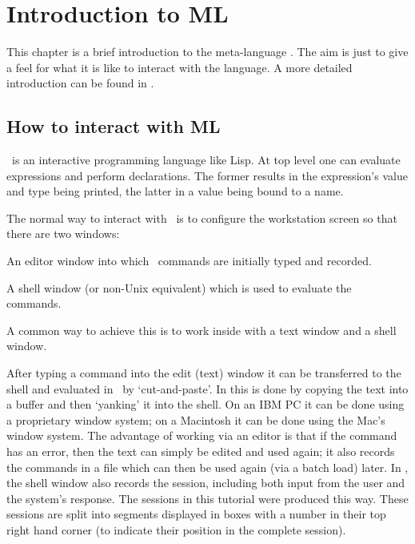 \chapter{Introduction to ML}
\label{ML}

This chapter is a brief introduction to the meta-language \ML.  The aim is just
to give a feel  for what  it is  like to  interact with  the language.   A more
detailed introduction can be found in \DESCRIPTION.

\section{How to interact with ML}

\ML\ is an interactive programming language like Lisp. At top level one can
evaluate expressions and perform declarations. The former results in the
expression's value and type being printed, the latter in a value being
bound to a name.  

The normal way to interact with \ML\ is to configure the workstation screen so that
there are two windows:
\begin{myenumerate}
\item An editor window into which \ML\ commands are initially typed and recorded.
\item A shell window (or non-Unix equivalent) which is used to evaluate the
commands.
\end{myenumerate}

\noindent A common way to achieve this is to work inside  with a text
window and a shell window.

After typing a command into the edit (text) window it can be transferred to the
shell and evaluated in \HOL\ by `cut-and-paste'. In  this is done by
copying the text into a buffer and then `yanking' it into the shell. On an {\small
IBM PC} it can be done using a proprietary window system; on a Macintosh it can be
done using the Mac's window system. The advantage of working via an editor is that
if the command has an error, then the text can simply be edited and used again; it
also records the commands in a file which can then be used again (via a batch load)
later. In , the shell window also records the session, including both
input from the user and the system's response. The sessions in this tutorial were
produced this way. These sessions are split into segments displayed in boxes with a
number in their top right hand corner (to indicate their position in the complete
session).

